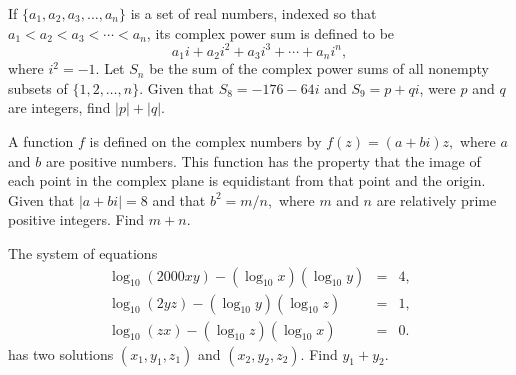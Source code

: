 \begin{question}[name={1998 AIME, \href{https://artofproblemsolving.com/community/c4p392484}{Problem 13}}]
	If $\{a_1,a_2,a_3,\ldots,a_n\}$ is a set of real numbers, indexed so that $a_1<a_2<a_3<\cdots<a_n$, its complex power sum is defined to be $$a_1i+a_2i^2+a_3i^3+\cdots+a_ni^n,$$ where $i^2=-1$. Let $S_n$ be the sum of the complex power sums of all nonempty subsets of $\{1,2,\ldots,n\}$. Given that $S_8=-176-64i$ and $S_9=p+qi$, were $p$ and $q$ are integers, find $|p|+|q|$.
\end{question}


%	













\begin{question}[name={1999 AIME, \href{https://artofproblemsolving.com/community/c4p392227}{Problem 9}}]
	A function $f$ is defined on the complex numbers by $f(z)=(a+bi)z,$ where $a$ and $b$ are positive numbers. This function has the property that the image of each point in the complex plane is equidistant from that point and the origin. Given that $|a+bi|=8$ and that $b^2=m/n,$ where $m$ and $n$ are relatively prime positive integers. Find $m+n.$	
	
\end{question}


%	












\begin{question}[name={2000 AIME I, \href{https://artofproblemsolving.com/community/c4p721503}{Problem 9}}]
	The system of equations
	\begin{eqnarray*}\log_{10}(2000xy) - (\log_{10}x)(\log_{10}y) & = & 4, \\
		\log_{10}(2yz) - (\log_{10}y)(\log_{10}z) & = & 1, \\
		\log_{10}(zx) - (\log_{10}z)(\log_{10}x) & = & 0.
	\end{eqnarray*}
	has two solutions $ (x_{1},y_{1},z_{1})$ and $ (x_{2},y_{2},z_{2}).$ Find $ y_{1} + y_{2}.$
\end{question}


